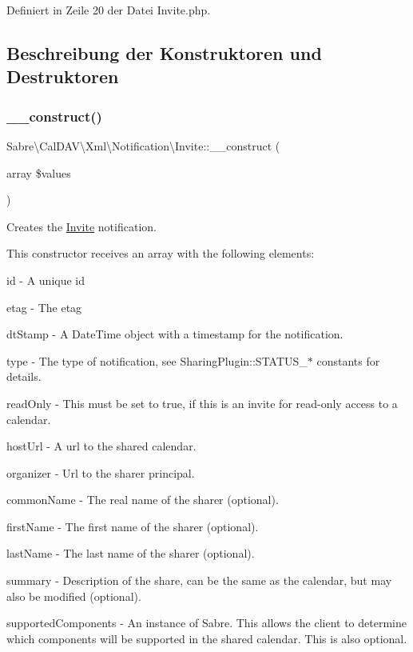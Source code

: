 Definiert in Zeile 20 der Datei Invite.\+php.



\subsection{Beschreibung der Konstruktoren und Destruktoren}
\mbox{\label{class_sabre_1_1_cal_d_a_v_1_1_xml_1_1_notification_1_1_invite_a09f7590e77022af5d3798c625072ba63}} 
\subsubsection{\texorpdfstring{\+\_\+\+\_\+construct()}{\_\_construct()}}
{\footnotesize\ttfamily Sabre\textbackslash{}\+Cal\+D\+A\+V\textbackslash{}\+Xml\textbackslash{}\+Notification\textbackslash{}\+Invite\+::\+\_\+\+\_\+construct (\begin{DoxyParamCaption}\item[{array}]{\$values }\end{DoxyParamCaption})}

Creates the \mbox{\hyperlink{class_sabre_1_1_cal_d_a_v_1_1_xml_1_1_notification_1_1_invite}{Invite}} notification.

This constructor receives an array with the following elements\+:


\begin{DoxyItemize}
\item id -\/ A unique id
\item etag -\/ The etag
\item dt\+Stamp -\/ A Date\+Time object with a timestamp for the notification.
\item type -\/ The type of notification, see Sharing\+Plugin\+::\+S\+T\+A\+T\+U\+S\+\_\+$\ast$ constants for details.
\item read\+Only -\/ This must be set to true, if this is an invite for read-\/only access to a calendar.
\item host\+Url -\/ A url to the shared calendar.
\item organizer -\/ Url to the sharer principal.
\item common\+Name -\/ The real name of the sharer (optional).
\item first\+Name -\/ The first name of the sharer (optional).
\item last\+Name -\/ The last name of the sharer (optional).
\item summary -\/ Description of the share, can be the same as the calendar, but may also be modified (optional).
\item supported\+Components -\/ An instance of Sabre. This allows the client to determine which components will be supported in the shared calendar. This is also optional.
\end{DoxyItemize}


